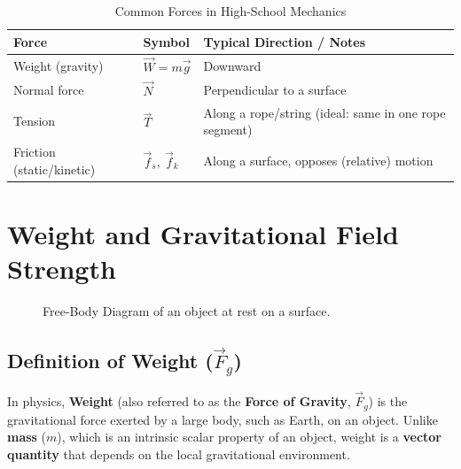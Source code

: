\documentclass{article}
\begin{document}
\begin{table}[h]
 \centering
 \caption{Common Forces in High-School Mechanics}
 \begin{tabular}{lll}
   \toprule
   \textbf{Force} & \textbf{Symbol} & \textbf{Typical Direction / Notes} \\ \midrule
   Weight (gravity) & $\vec{W}=m\vec{g}$ & Downward \\
   Normal force & $\vec{N}$ & Perpendicular to a surface \\
   Tension & $\vec{T}$ & Along a rope/string (ideal: same in one rope segment) \\
   Friction (static/kinetic) & $\vec{f}_s,\ \vec{f}_k$ & Along a surface, opposes (relative) motion \\
   \bottomrule
 \end{tabular}
\end{table}

\newpage

\section{Weight and Gravitational Field Strength}


\begin{figure}[h]
    \centering
    \caption{Free-Body Diagram of an object at rest on a surface.}
\end{figure}

\subsection{Definition of Weight ($\vec{F}_g$)}
In physics, \textbf{Weight} (also referred to as the \textbf{Force of Gravity}, $\vec{F}_g$) is the gravitational force exerted by a large body, such as Earth, on an object. Unlike \textbf{mass} ($m$), which is an intrinsic scalar property of an object, weight is a \textbf{vector quantity} that depends on the local gravitational environment.
\end{document}
